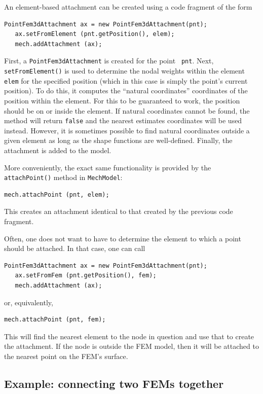 An element-based attachment can be created using a code fragment
of the form
%
\begin{lstlisting}[]
   PointFem3dAttachment ax = new PointFem3dAttachment(pnt);
   ax.setFromElement (pnt.getPosition(), elem);
   mech.addAttachment (ax);
\end{lstlisting}
%
First, a {\tt PointFem3dAttachment} is created for the point {\tt
pnt}. Next, {\tt setFromElement()} is used to determine the nodal
weights within the element {\tt elem} for the specified position
(which in this case is simply the point's current position).  To do
this, it computes the ``natural coordinates'' coordinates of the
position within the element. For this to be guaranteed to work, the
position should be on or inside the element. If natural coordinates
cannot be found, the method will return {\tt false} and the nearest
estimates coordinates will be used instead. However, it is
sometimes possible to find natural coordinates outside a given element
as long as the shape functions are well-defined. Finally, the
attachment is added to the model.

More conveniently, the exact same functionality is provided
by the {\tt attachPoint()} method in {\tt MechModel}:
%
\begin{lstlisting}[]
   mech.attachPoint (pnt, elem);
\end{lstlisting}
%
This creates an attachment identical to that created by the previous
code fragment.

Often, one does not want to have to determine the element 
to which a point should be attached. In that case, one can call
%
\begin{lstlisting}[]
   PointFem3dAttachment ax = new PointFem3dAttachment(pnt);
   ax.setFromFem (pnt.getPosition(), fem);
   mech.addAttachment (ax);
\end{lstlisting}
%
or, equivalently, 
%
\begin{lstlisting}[]
   mech.attachPoint (pnt, fem);
\end{lstlisting}
%
This will find the nearest element to the node in question and use
that to create the attachment. If the node is outside the FEM model,
then it will be attached to the nearest point on the FEM's surface.

\subsection{Example: connecting two FEMs together}
\label{connectingTwoFems:sec}

